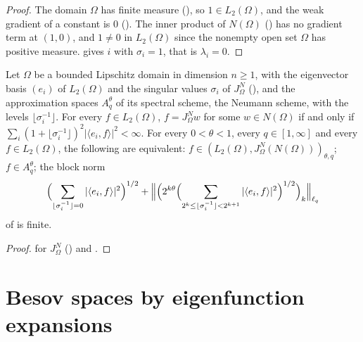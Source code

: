 \begin{proof}
\leanok
The domain $\Omega$ has finite measure (), so
$1 \in L_2(\Omega)$, and the weak gradient of a constant is $0$
(). The inner product of $N(\Omega)$
() has no gradient term at $(1, 0)$, and $1 \neq 0$ in $L_2(\Omega)$
since the nonempty open set $\Omega$ has positive measure.
 gives $i$ with $\sigma_i = 1$, that is $\lambda_i = 0$.
\end{proof}

\begin{corollary}
\label{cor:neumann-interpolation}
\leanok
{}
Let $\Omega$ be a bounded Lipschitz domain in dimension $n \geq 1$, with the eigenvector basis
$(e_i)$ of $L_2(\Omega)$ and the singular values $\sigma_i$ of $J^N_\Omega$
(), and the approximation spaces $A^\theta_q$ of its spectral scheme,
the Neumann scheme, with the levels $\lfloor \sigma_i^{-1} \rfloor$.
For every $f \in L_2(\Omega)$, $f = J^N_\Omega w$ for some $w \in N(\Omega)$ if and only if
$\sum_i (1 + \lfloor \sigma_i^{-1} \rfloor)^2 |\langle e_i, f \rangle|^2 < \infty$. For every
$0 < \theta < 1$, every $q \in [1, \infty]$ and every $f \in L_2(\Omega)$, the following are
equivalent: $f \in (L_2(\Omega), J^N_\Omega(N(\Omega)))_{\theta, q}$; $f \in A^\theta_q$; the
block norm
\[
  \Bigl(\sum_{\lfloor \sigma_i^{-1} \rfloor = 0} |\langle e_i, f \rangle|^2\Bigr)^{1/2}
  + \Bigl\| \Bigl(2^{k\theta} \Bigl(\sum_{2^k \leq \lfloor \sigma_i^{-1} \rfloor < 2^{k+1}}
    |\langle e_i, f \rangle|^2\Bigr)^{1/2}\Bigr)_k \Bigr\|_{\ell_q}
\]
of  is finite.
\end{corollary}

\begin{proof}
\leanok
{} for $J^N_\Omega$ () and
.
\end{proof}

\section{Besov spaces by eigenfunction expansions}
\label{sec:spectral-besov-domains}

